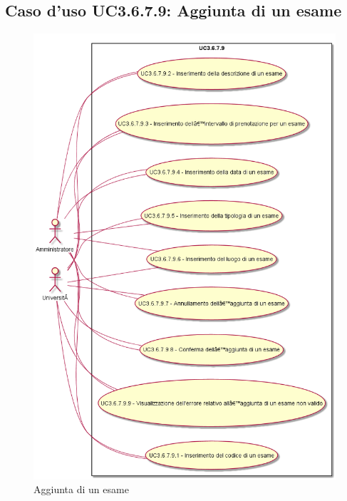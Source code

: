 \subsection{Caso d'uso \texorpdfstring{UC3.6.7.9}{UC3.6.7.9}: Aggiunta di un esame}
\begin{figure} [H]
\centering
\includegraphics[scale=0.45]{./img/UC3-6-7-9.png}
\caption{Aggiunta di un esame}\label{}
\end{figure}
